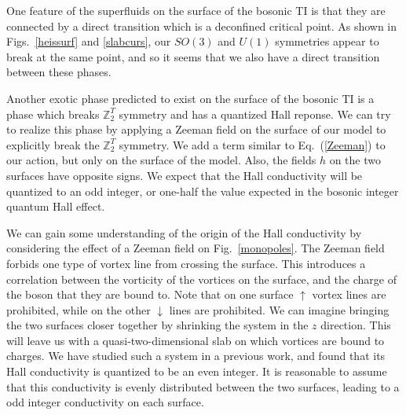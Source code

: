 \documentclass[prb,twocolumn]{revtex4-1}
\def\ztwot{\mathbb{Z}_2^T}
\begin{document}
One feature of the superfluids on the surface of the bosonic TI is that they are connected by a direct transition which is a deconfined critical point.\cite{SenthilVishwanath} As shown in Figs.~\ref{heissurf} and \ref{slabcurs}, our $SO(3)$ and $U(1)$ symmetries appear to break at the same point, and so it seems that we also have a direct transition between these phases.


Another exotic phase predicted to exist on the surface of the bosonic TI is a phase which breaks $\ztwot$ symmetry and has a quantized Hall reponse. We can try to realize this phase by applying a Zeeman field on the surface of our model to explicitly break the $\ztwot$ symmetry. We add a term similar to Eq.~(\ref{Zeeman}) to our action, but only on the surface of the model. Also, the fields $h$ on the two surfaces have opposite signs. We expect that the Hall conductivity will be quantized to an odd integer, or one-half the value expected in the bosonic integer quantum Hall effect.

We can gain some understanding of the origin of the Hall conductivity by considering the effect of a Zeeman field on Fig.~\ref{monopoles}. The Zeeman field forbids one type of vortex line from crossing the surface. This introduces a correlation between the vorticity of the vortices on the surface, and the charge of the boson that they are bound to. Note that on one surface $\uparrow$ vortex lines are prohibited, while on the other $\downarrow$ lines are prohibited. We can imagine bringing the two surfaces closer together by shrinking the system in the $z$ direction. This will leave us with a quasi-two-dimensional slab on which vortices are bound to charges. We have studied such a system in a previous work,\cite{FQHE} and found that its Hall conductivity is quantized to be an even integer. It is reasonable to assume that this conductivity is evenly distributed between the two surfaces, leading to a odd integer conductivity on each surface. 
\end{document}
